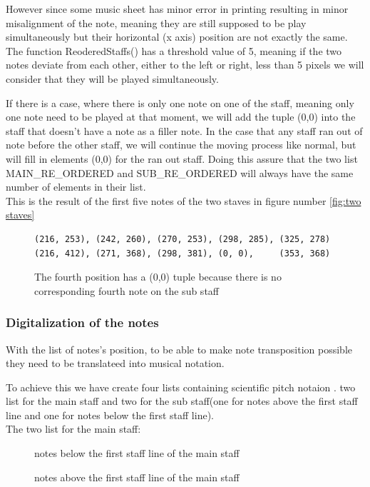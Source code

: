 \documentclass[a4paper,12pt]{report}
\begin{document}
However since some music sheet has minor error in printing resulting in minor
misalignment of the note, meaning they are still supposed to be play
simultaneously but their horizontal (x axis) position are not exactly the
same. The function ReoderedStaffs() has a threshold value of 5, meaning if
the two notes deviate from each other, either to the left or right, less than
5 pixels we will consider that they will be played simultaneously.

If there is a case, where there is only one note on one of the staff, meaning
only one note need to be played at that moment, we will add the tuple (0,0)
into the staff that doesn't have a note as a filler note. In the case that any
staff ran out of note before the other staff, we will continue the moving
process like normal, but will fill in elements (0,0) for the ran out staff.
Doing this assure that the two list MAIN\_RE\_ORDERED and SUB\_RE\_ORDERED will
always have the same number of elements in their list.\\

\noindent This is the result of the first five notes of the two staves in figure number
\ref{fig:two staves}\\

\begin{figure}[H]
\begin{verbatim}
(216, 253), (242, 260), (270, 253), (298, 285), (325, 278)
(216, 412), (271, 368), (298, 381), (0, 0),     (353, 368)
\end{verbatim}
\caption{The fourth position has a (0,0) tuple because there is no corresponding fourth
note on the sub staff}
\end{figure}

\subsubsection{Digitalization of the notes}
With the list of notes's position, to be able to make note transposition possible
they need to be translateed into musical notation.

To achieve this we have create four lists containing scientific pitch notaion
\cite{Wikipedia2013}.  two list for the main staff and two for the sub staff(one
for notes above the first staff line and one for notes below the first staff
line).\\

The two list for the main staff:
\begin{figure}[h]
\centering
\makebox[\textwidth]{['E5','D5','C5','B4','A4','G4','F4','E4','D4','C4','B3','A3','G3','F3','E3','D3','C3']}
\caption{notes below the first staff line of the main staff}
\vspace{\baselineskip}
\makebox[\textwidth]{['E5','F5','G5','A5','B5','C6','D6','E6','F6','G6']}
\caption{notes above the first staff line of the main staff}
\end{figure}
\end{document}
